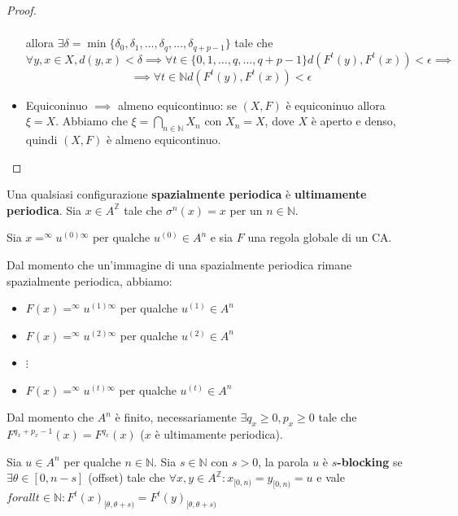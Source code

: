\begin{teorema}
\begin{proof}
\begin{itemize}
\begin{equation*}
\begin{array}{cl}
                      \end{array}
                  \end{equation*}
                  allora $\exists \delta = \min \{\delta_0,\delta_1, \dots, \delta_q,\dots, \delta_{q+p-1}\}$ tale che
                  $$\forall y, x\in X, d(y,x) < \delta \implies \forall t\in \{0,1,\dots,q,\dots,q+p-1\} d(F^t(y),F^t(x))< \epsilon \implies $$$$\implies
                      \forall t\in \mathbb{N} d(F^t(y),F^t(x))< \epsilon$$
            \item Equiconinuo $\implies$ almeno equicontinuo: se $(X ,F)$ è equiconinuo
                allora $\xi = X$.  Abbiamo che $\xi = \bigcap_{n\in \mathbb{N}}X_n$ con $X_n= X$,
                dove $X$ è aperto e denso, quindi $(X,F)$ è almeno equicontinuo.
        \end{itemize}
    \end{proof}
\end{teorema}

\begin{nota}
    Una qualsiasi configurazione \textbf{spazialmente periodica} è \textbf{ultimamente periodica}.
    Sia $x\in A^\mathbb{Z}$ tale che $\sigma ^n(x)=x$ per un $n\in \mathbb{N}$.

    Sia $x=^\infty u^{(0)\infty}$ per qualche $u^{(0)}\in  A^n$ e sia $F$ una regola 
    globale di un CA. 

    Dal momento che un'immagine di una spazialmente periodica rimane spazialmente periodica,
    abbiamo:
    \begin{itemize}
        \item $F(x)=^\infty u^{(1)\infty}$ per qualche $u^{(1)}\in  A^n$
        \item $F(x)=^\infty u^{(2)\infty}$ per qualche $u^{(2)}\in  A^n$
        \item $\vdots$
        \item $F(x)=^\infty u^{(t)\infty}$ per qualche $u^{(t)}\in  A^n$
    \end{itemize}
    Dal momento che $A^n$ è finito, necessariamente $\exists q_x\ge 0, p_x\ge 0$ 
    tale che $F^{q_x+p_x-1}(x)=F^{q_x}(x)$ ($x$ è ultimamente periodica).
\end{nota}
\begin{definizione}
    Sia $u\in A^n$ per qualche $n\in \mathbb{N}$. Sia $s\in \mathbb{N}$ con $s>0$,
    la parola $u$ è $s$\textbf{-blocking} se $\exists \theta\in [0,n-s]$ (offset)
    tale che $\forall x,y\in A^\mathbb{Z}:x_{[0,n)}=y_{[0,n)}=u$ e vale $forall t\in \mathbb{N}:
    F^t(x)_{[\theta,\theta +s)} =F^t(y)_{[\theta,\theta +s)}$
\end{definizione}

